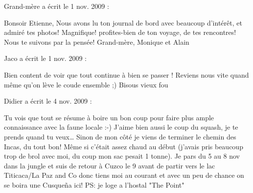 \medskip
Grand-mère a écrit le 1 nov. 2009 :
\begin{displayquote}
Bonsoir Etienne,
Nous avons lu ton journal de bord avec beaucoup d'intérêt, et admiré tes photos! Magnifique! profites-bien de ton voyage, de tes rencontres! Nous te suivons par la pensée!
Grand-mère, Monique et Alain
\end{displayquote}

\medskip
Jaco a écrit le 1 nov. 2009 :
\begin{displayquote}
Bien content de voir que tout continue à bien se passer !
Reviens nous vite quand même qu'on lève le coude ensemble ;)
Bisous vieux fou
\end{displayquote}

\medskip
Didier a écrit le 4 nov. 2009 :
\begin{displayquote}
Tu vois que tout se résume à boire un bon coup pour faire plus ample connaissance avec la faune locale :-)
J'aime bien aussi le coup du squash, je te prends quand tu veux\dots
Sinon de mon côté je viens de terminer le chemin des Incas, du tout bon! Même si c'était assez chaud au début (j'avais pris beaucoup trop de brol avec moi, du coup mon sac pesait 1 tonne).
Je pars du 5 au 8 nov dans la jungle et suis de retour à Cuzco le 9 avant de partir vers le lac Titicaca/La Paz and Co donc tiens moi au courant et avec un peu de chance on se boira une Cusqueña ici!
PS: je loge a l'hostal "The Point"
\end{displayquote}

\vfill
